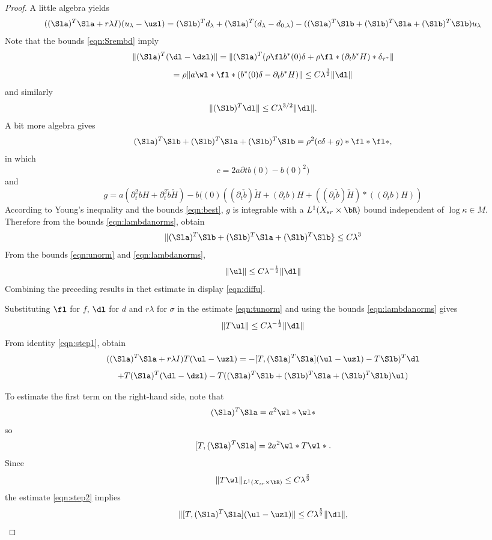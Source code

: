 \begin{proof}
  A little algebra yields
  \begin{equation}
    \label{eqn:step1}
    ((\Sla)^T\Sla + r\lambda I) (u_{\lambda}-\uzl) = (\Slb)^T d_{\lambda} + (\Sla)^T(d_{\lambda}-d_{0,\lambda})- 
    ((\Sla)^T\Slb + (\Slb)^T\Sla + (\Slb)^T\Slb)u_{\lambda}
  \end{equation}
  Note that the bounds \ref{eqn:Srembd} imply
\[
  \|(\Sla)^T (\dl-\dzl)\| = \|(\Sla)^T(\rho \fl b^*(0)\delta +
  \rho \fl*(\partial_tb^*H)*\delta_{\tau^*}\|
\]
\[
  = \rho \|a \wl * \fl * (b^*(0)\delta - \partial_tb^*H)\|
  \le C \lambda^{\frac{3}{2}}\|\dl\|
\]
and similarly
\[
 \| (\Slb)^T\dl \| \le C \lambda^{3/2}\|\dl\|.
\]
A bit more algebra gives
\[
  (\Sla)^T\Slb + (\Slb)^T\Sla + (\Slb)^T\Slb = \rho^2 (c \delta + g) *
  \fl * \fl *,
\]
in which
\[
  c = 2a \partial t b(0) - b(0)^2)
\]
and
\[
  g = a(\partial^2_t b H + \partial^2_t \check{b}\check{H}) -
  b((0)((\partial_t \check{b}) \check{H} + (\partial_t b) H +
  ((\partial_t \check{b}) \check{H})*((\partial_t b)H)) 
\]
According to Young's inequality and the bounds \ref{eqn:best}, $g$ is integrable with a 
$L^1(X_{sr}\times \bR)$ bound independent of $\log \kappa \in
M$. Therefore from the bounds \ref{eqn:lambdanorms}, obtain
\begin{equation}
  \label{eqn:step2}
\|(\Sla)^T\Slb + (\Slb)^T\Sla + (\Slb)^T\Slb\} \le C \lambda^3
\end{equation}
From the bounds \ref{eqn:unorm} and \ref{eqn:lambdanorms},
\[
  \|\ul\| \le C \lambda^{-\frac{1}{2}}\|\dl\|
\]
Combining the preceding results in thet estimate in display
\ref{eqn:diffu}.

Substituting $\fl$ for $f$, $\dl$ for $d$ and $r\lambda$ for $\sigma$ in the estimate \ref{eqn:tunorm} and using
the bounds \ref{eqn:lambdanorms} gives
\begin{equation}
  \label{eqn:step3}
  \|T\ul\| \le C \lambda^{-\frac{1}{2}}\|\dl\|
\end{equation}
From identity \ref{eqn:step1}, obtain
\[
   ((\Sla)^T\Sla + r\lambda I) T(\ul-\uzl) = -[T,
   (\Sla)^T\Sla](\ul-\uzl) - T \Slb)^T \dl 
 \]
\begin{equation}
  \label{eqn:step4}
 + T (\Sla)^T(\dl-\dzl)- 
  T((\Sla)^T\Slb + (\Slb)^T\Sla + (\Slb)^T\Slb)\ul)
\end{equation}

To estimate the first term on the right-hand side, note that
\[
  (\Sla)^T\Sla = a^2 \wl * \wl*
\]
so
\[
  [T,  (\Sla)^T\Sla] = 2 a^2 \wl*T\wl*.
\]
Since
\begin{equation}
  \label{eqn:twl}
  \|T\wl\|_{L^1(X_{sr}\times \bR)} \le C\lambda^{\frac{3}{2}}
\end{equation}
the estimate \ref{eqn:step2} implies
\begin{equation}
  \label{step5}
  \|[T,  (\Sla)^T\Sla](\ul-\uzl)\| \le C \lambda^{\frac{5}{2}}\|\dl\|,
\end{equation}


\end{proof}
